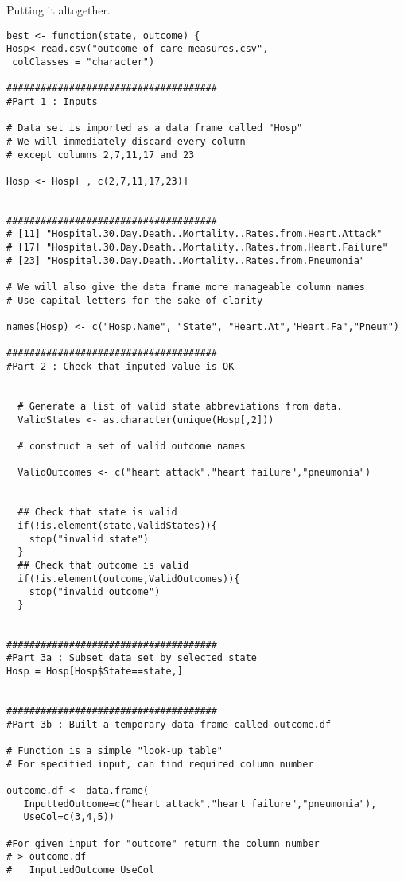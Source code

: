 \documentclass[]{article}
\begin{document}
\newpage
Putting it altogether.
\begin{framed}
\begin{verbatim}
best <- function(state, outcome) {
Hosp<-read.csv("outcome-of-care-measures.csv",
 colClasses = "character")

#####################################
#Part 1 : Inputs

# Data set is imported as a data frame called "Hosp"
# We will immediately discard every column 
# except columns 2,7,11,17 and 23

Hosp <- Hosp[ , c(2,7,11,17,23)]


#####################################
# [11] "Hospital.30.Day.Death..Mortality..Rates.from.Heart.Attack"                            
# [17] "Hospital.30.Day.Death..Mortality..Rates.from.Heart.Failure"                           
# [23] "Hospital.30.Day.Death..Mortality..Rates.from.Pneumonia"        

# We will also give the data frame more manageable column names
# Use capital letters for the sake of clarity

names(Hosp) <- c("Hosp.Name", "State", "Heart.At","Heart.Fa","Pneum")

#####################################
#Part 2 : Check that inputed value is OK


  # Generate a list of valid state abbreviations from data.
  ValidStates <- as.character(unique(Hosp[,2]))

  # construct a set of valid outcome names

  ValidOutcomes <- c("heart attack","heart failure","pneumonia")


  ## Check that state is valid
  if(!is.element(state,ValidStates)){
    stop("invalid state")
  }
  ## Check that outcome is valid
  if(!is.element(outcome,ValidOutcomes)){
    stop("invalid outcome")
  }


#####################################
#Part 3a : Subset data set by selected state
Hosp = Hosp[Hosp$State==state,]


#####################################
#Part 3b : Built a temporary data frame called outcome.df

# Function is a simple "look-up table"
# For specified input, can find required column number

outcome.df <- data.frame(
   InputtedOutcome=c("heart attack","heart failure","pneumonia"),
   UseCol=c(3,4,5))

#For given input for "outcome" return the column number 
# > outcome.df
#   InputtedOutcome UseCol


\end{verbatim}
\end{framed}
\end{document}

